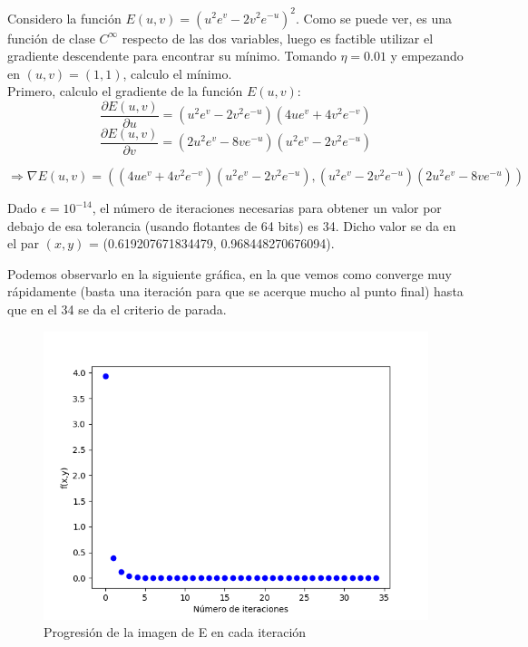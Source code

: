 Considero la función $E(u,v) = (u^2e^v-2v^2e^{-u})^2$. Como se puede ver, es una función de clase $C^{\infty}$ respecto de las dos variables, luego es factible utilizar el gradiente descendente para encontrar su mínimo. Tomando $\eta=0.01$ y empezando en $(u,v)=(1,1)$, calculo el mínimo. \\

Primero, calculo el gradiente de la función $E(u,v)$:
$$\frac{\partial E(u,v)}{\partial u} = (u^2e^v-2v^2e^{-u})(4ue^v+4v^2e^{-v})$$
$$\frac{\partial E(u,v)}{\partial v} = (2u^2e^v-8ve^{-u})(u^2e^v-2v^2e^{-u})$$

$$\Rightarrow \nabla E(u,v) = \left((4ue^v+4v^2e^{-v})(u^2e^v-2v^2e^{-u}),(u^2e^v-2v^2e^{-u})(2u^2e^v-8ve^{-u})\right)$$

Dado $\epsilon = 10^{-14}$, el número de iteraciones necesarias para obtener un valor por debajo de esa tolerancia (usando flotantes de 64 bits) es 34. Dicho valor se da en el par $(x,y)$ = (0.619207671834479, 0.968448270676094).

Podemos observarlo en la siguiente gráfica, en la que vemos como converge muy rápidamente (basta una iteración para que se acerque mucho al punto final) hasta que en el 34 se da el criterio de parada. \\

\begin{figure}[H] %
	\centering
	\includegraphics[scale=0.6]{e1.png}  %
	\caption{Progresión de la imagen de E en cada iteración} 
	\label{fig:e1}
\end{figure}

